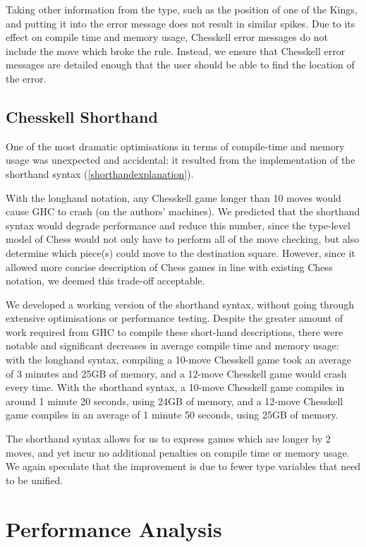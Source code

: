 Taking other information from the  type, such as the position of one of the Kings, and putting it into the error message does not result in similar spikes. Due to its effect on compile time and memory usage, Chesskell error messages do not include the move which broke the rule. Instead, we ensure that Chesskell error messages are detailed enough that the user should be able to find the location of the error.

\subsection{Chesskell Shorthand} \label{shorthand}

One of the most dramatic optimisations in terms of compile-time and memory usage was unexpected and accidental: it resulted from the implementation of the shorthand syntax (\cref{shorthandexplanation}).

With the longhand notation, any Chesskell game longer than 10 moves would cause GHC to crash (on the authors' machines). We predicted that the shorthand syntax would degrade performance and reduce this number, since the type-level model of Chess would not only have to perform all of the move checking, but also determine which piece(s) could move to the destination square. However, since it allowed more concise description of Chess games in line with existing Chess notation, we deemed this trade-off acceptable.

We developed a working version of the shorthand syntax, without going through extensive optimisations or performance testing. Despite the greater amount of work required from GHC to compile these short-hand descriptions, there were notable and significant decreases in average compile time and memory usage: with the longhand syntax, compiling a 10-move Chesskell game took an average of 3 minutes and 25GB of memory, and a 12-move Chesskell game would crash every time. With the shorthand syntax, a 10-move Chesskell game compiles in around 1 minute 20 seconds, using 24GB of memory, and a 12-move Chesskell game compiles in an average of 1 minute 50 seconds, using 25GB of memory.

The shorthand syntax allows for us to express games which are longer by 2 moves, and yet incur no additional penalties on compile time or memory usage. We again speculate that the improvement is due to fewer type variables that need to be unified.

\section{Performance Analysis} \label{performanceanalysis}


